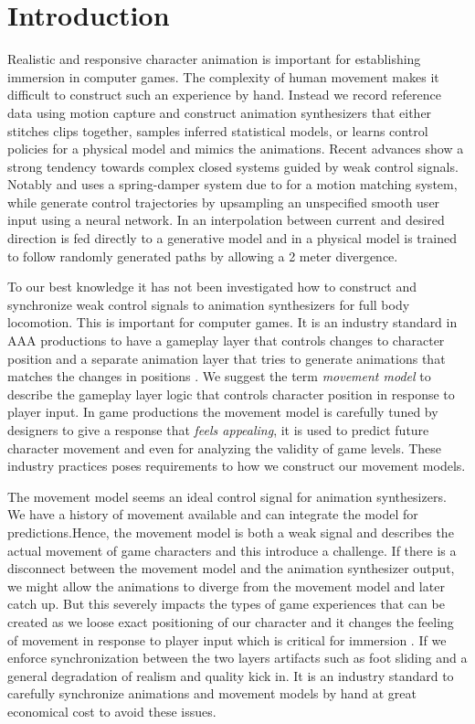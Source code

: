 \section{Introduction}
Realistic and responsive character animation is important for establishing immersion in computer games. The complexity of human movement makes it difficult to construct such an experience by hand. Instead we record reference data using motion capture and construct animation synthesizers that either stitches clips together, samples inferred statistical models, or learns control policies for a physical model and mimics the animations. Recent advances 
show a strong tendency towards complex closed systems guided by weak control signals. Notably \citep{holden.ea20} and \citep{Bergamin19} uses a spring-damper system due to \citep{kermse.04} for a motion matching system, while \citep{startke20} generate control trajectories by upsampling an unspecified smooth user input using a neural network. In \citep{zhang18} an interpolation between current and desired direction is fed directly to a generative model and in \citep{peng17} a physical model is trained to follow randomly generated paths by allowing a 2 meter divergence. 

To our best knowledge it has not been investigated how to construct and synchronize weak control signals to animation synthesizers for full body locomotion. This is important for computer games. It is an industry standard in AAA productions to have a gameplay layer that controls changes to character position and a separate animation layer that tries to generate animations that matches the changes in positions \citep{holden18}. We suggest the term \textit{movement model} to describe the gameplay layer logic that controls character position in response to player input. In game productions the movement model is carefully tuned by designers to give a response that \textit{feels appealing}, it is used to predict future character movement and even for analyzing the validity of game levels. These industry practices poses requirements to how we construct our movement models. 

The movement model seems an ideal control signal for animation synthesizers. We have a history of movement available and can integrate the model for predictions.Hence, the movement model is both a weak signal and describes the actual movement of game characters and this introduce a challenge. If there is a disconnect between the movement model and the animation synthesizer output, we might allow the animations to diverge from the movement model and later catch up. But this severely impacts the types of game experiences that can be created as we loose exact positioning of our character and it changes the feeling of movement in response to player input which is critical for immersion . If we enforce synchronization between the two layers artifacts such as foot sliding and a general degradation of realism and quality kick in. It is an industry standard to carefully synchronize animations and movement models by hand at great economical cost to avoid these issues. 

